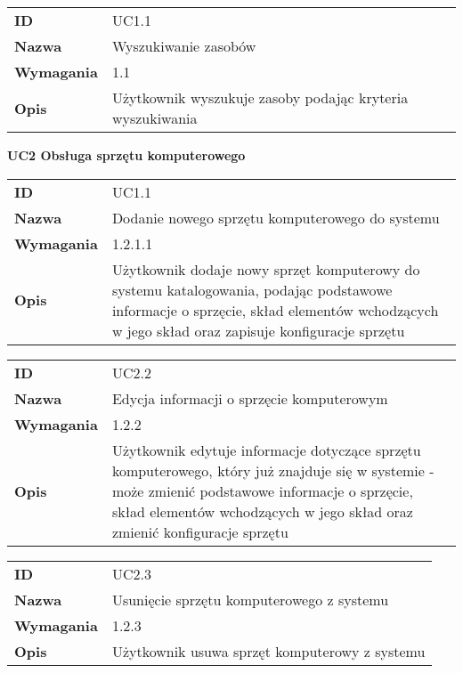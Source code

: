 \begin{tabular}{p{}p{}}
\hfill {\bf ID} & UC1.1 \\
\hfill {\bf Nazwa} & Wyszukiwanie zasobów \\
\hfill {\bf Wymagania} & 1.1 \\
\hfill {\bf Opis} & Użytkownik wyszukuje zasoby podając kryteria wyszukiwania \\
\end{tabular}

\vspace{.03\textheight}
\begin{center}
  {\Large\bf UC2 Obsługa sprzętu komputerowego} \\
\end{center}
\vspace{.02\textheight}

\begin{tabular}{p{}p{}}
\hfill {\bf ID} & UC1.1 \\
\hfill {\bf Nazwa} & Dodanie nowego sprzętu komputerowego do systemu \\
\hfill {\bf Wymagania} & 1.2.1.1\\
\hfill {\bf Opis} & Użytkownik dodaje nowy sprzęt komputerowy do systemu katalogowania, podając podstawowe informacje o sprzęcie, skład elementów wchodzących w jego skład oraz zapisuje konfiguracje sprzętu \\
\end{tabular}

\vspace{.05\textheight}

\begin{tabular}{p{}p{}}
\hfill {\bf ID} & UC2.2 \\
\hfill {\bf Nazwa} & Edycja informacji o sprzęcie komputerowym \\
\hfill {\bf Wymagania} & 1.2.2 \\
\hfill {\bf Opis} & Użytkownik edytuje informacje dotyczące sprzętu komputerowego, który już znajduje się w systemie - może zmienić podstawowe informacje o sprzęcie, skład elementów wchodzących w jego skład oraz zmienić konfiguracje sprzętu \\
\end{tabular}

\vspace{.05\textheight}

\begin{tabular}{p{}p{}}
\hfill {\bf ID} & UC2.3 \\
\hfill {\bf Nazwa} & Usunięcie sprzętu komputerowego z systemu \\
\hfill {\bf Wymagania} & 1.2.3 \\
\hfill {\bf Opis} & Użytkownik usuwa sprzęt komputerowy z systemu \\
\end{tabular}

